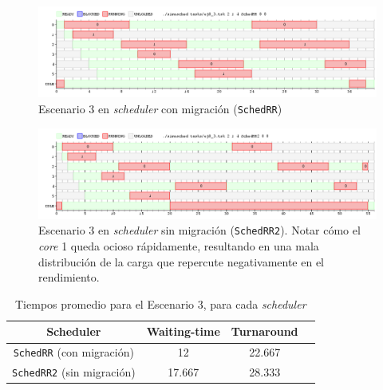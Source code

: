 \begin{figure}[H]
    \begin{center}
        \includegraphics[width=1\columnwidth]{imagenes/ej8_3_rr.png}
        \caption{Escenario 3 en \emph{scheduler} con migración (\texttt{SchedRR})}
    \end{center}
\end{figure}

\begin{figure}[H]
    \begin{center}
        \includegraphics[width=1\columnwidth]{imagenes/ej8_3_rr2.png}
        \caption{Escenario 3 en \emph{scheduler} sin migración
        (\texttt{SchedRR2}). Notar cómo el \emph{core} 1 queda ocioso
        rápidamente, resultando en una mala distribución de la carga que
        repercute negativamente en el rendimiento.}
    \end{center}
\end{figure}

\begin{table}[H]
    \begin{center}
        \begin{tabular}{|c|c|c|c|}
            \hline
            \textbf{Scheduler}                 & \textbf{Waiting-time} & \textbf{Turnaround} \\ \hline
            \texttt{SchedRR} (con migración)   & 12                    & 22.667 \\
            \texttt{SchedRR2} (sin migración)  & 17.667                & 28.333 \\ \hline
        \end{tabular}
        \caption{Tiempos promedio para el Escenario 3, para cada \emph{scheduler}}
    \end{center}
\end{table}
